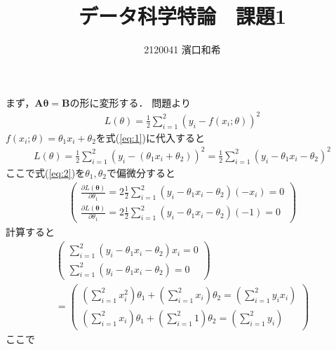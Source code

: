 \documentclass[uplatex,b5j]{jsarticle} %
\begin{document}
\title{データ科学特論　課題1}
\author{2120041 濱口和希}
\maketitle                      %

\section{}
まず，$\boldsymbol{A\theta}=\boldsymbol{B}$の形に変形する．
問題より
\begin{eqnarray}
    L(\theta) = \frac{1}{2}\sum_{i=1}^{2}(y_i - f(x_i;\theta))^2 \label{eq:1}
\end{eqnarray}
$f(x_i;\theta)=\theta_1x_i+\theta_2$を式(\ref{eq:1})に代入すると
\begin{eqnarray}
    L(\theta) = \frac{1}{2}\sum_{i=1}^{2}(y_i - (\theta_1x_i+\theta_2))^2 = \frac{1}{2}\sum_{i=1}^{2}(y_i - \theta_1x_i - \theta_2)^2 \label{eq:2}
\end{eqnarray}
ここで式(\ref{eq:2})を$\theta_1, \theta_2$で偏微分すると
\begin{eqnarray} \label{eq:3}
    \left(
    \begin{array}{c}
        \frac{\partial L(\boldsymbol{\theta})}{\partial \theta_1} = 2\frac{1}{2}\sum_{i=1}^{2}(y_i - \theta_1x_i - \theta_2)(-x_i) = 0 \\
        \frac{\partial L(\boldsymbol{\theta})}{\partial \theta_1} = 2\frac{1}{2}\sum_{i=1}^{2}(y_i - \theta_1x_i - \theta_2)(-1) = 0
    \end{array}
    \right)
\end{eqnarray}
計算すると
\begin{eqnarray}
    \left(
    \begin{array}{c} \label{eq:4}
        \sum_{i=1}^{2}(y_i - \theta_1x_i - \theta_2)x_i = 0 \\
        \sum_{i=1}^{2}(y_i - \theta_1x_i - \theta_2) = 0
    \end{array}
    \right) \\
    =
    \left(
    \begin{array}{c} \label{eq:5}
        (\sum_{i=1}^{2}x_{i}^{2})\theta_1 + (\sum_{i=1}^{2}x_i)\theta_2 = (\sum_{i=1}^{2}y_ix_i) \\
        (\sum_{i=1}^{2}x_i)\theta_1 + (\sum_{i=1}^{2}1)\theta_2 = (\sum_{i=1}^{2}y_i)
    \end{array}
    \right)
\end{eqnarray}
ここで
\end{document}
